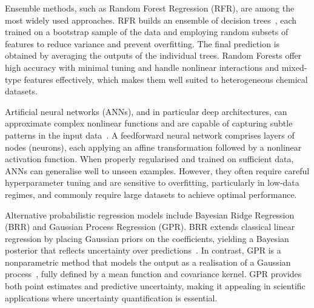 Ensemble methods, such as Random Forest Regression (RFR), are among the most
widely used approaches. RFR builds an ensemble of
decision trees~\cite{Breiman2001}, each trained on a bootstrap sample of the
data and employing random subsets of features to reduce variance and prevent
overfitting. The final prediction is obtained by averaging the outputs of the
individual trees. Random Forests offer high accuracy with minimal tuning and
handle nonlinear interactions and mixed-type features effectively, which makes
them well suited to heterogeneous chemical datasets.

Artificial neural networks (ANNs), and in particular deep architectures, can
approximate complex nonlinear functions and are capable of capturing subtle
patterns in the input data~\cite{Goodfellow2016}. A feedforward neural network
comprises layers of nodes (neurons), each applying an affine transformation
followed by a nonlinear activation function. When properly regularised and
trained on sufficient data, ANNs can generalise well to unseen examples.
However, they often require careful hyperparameter tuning and are sensitive to
overfitting, particularly in low-data regimes, and commonly require large
datasets to achieve optimal performance.

\newpage
Alternative probabilistic regression models include Bayesian Ridge Regression
(BRR) and Gaussian Process Regression (GPR). BRR extends classical linear
regression by placing Gaussian priors on the coefficients, yielding a
Bayesian posterior that reflects uncertainty over predictions~\cite{Tipping2001}.
In contrast, GPR is a nonparametric method that models the output as a
realisation of a Gaussian process~\cite{Rasmussen2006}, fully defined by a mean
function and covariance kernel. GPR provides both point estimates and
predictive uncertainty, making it appealing in scientific
applications where uncertainty quantification is essential.


